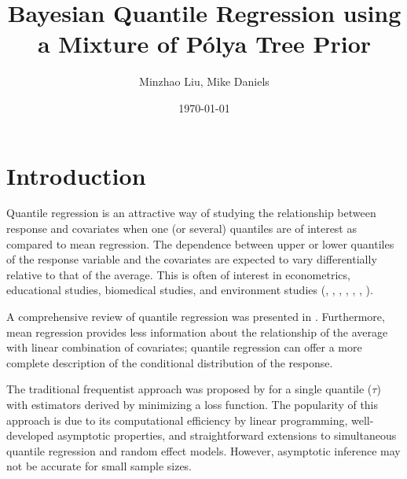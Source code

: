 \documentclass[12pt]{article}
\title{Bayesian Quantile Regression using a  Mixture of P\'{o}lya Tree Prior}
\date{\today}
\author{Minzhao Liu, Mike Daniels}
\begin{document}

\maketitle{}

\section{Introduction}

Quantile regression is an attractive way of studying the relationship
between response and covariates 
when one (or several)
quantiles are of interest  
as compared to mean
regression. 
The dependence
between upper or lower quantiles of the response variable and the
covariates are expected to vary differentially relative to that of the
average. This is often of interest in econometrics,
educational studies, biomedical studies, and environment
studies (\citet{yu2001}, \citet{buchinsky1994},
    \citet{buchinsky1998}, \citet{he1998}, \citet{koenker1999},
    \citet{wei2006}, \citet{yu2003}).
   
A comprehensive review of quantile regression was presented in \citet{koenker2005}.  
Furthermore, mean regression provides 
less information about the relationship of the average with linear
combination of covariates;  quantile regression can offer a more
complete description of the conditional distribution of the response. 

The traditional frequentist approach was proposed by
\citet{koenker1978} for a single quantile ($\tau$) with estimators derived by 
minimizing a loss function. The
popularity of this approach is due 
to its computational efficiency by linear programming, well-developed
asymptotic properties, and straightforward extensions to
simultaneous quantile regression and random effect models. However,
asymptotic inference may not be accurate  for small sample
sizes. 
 
\end{document}
